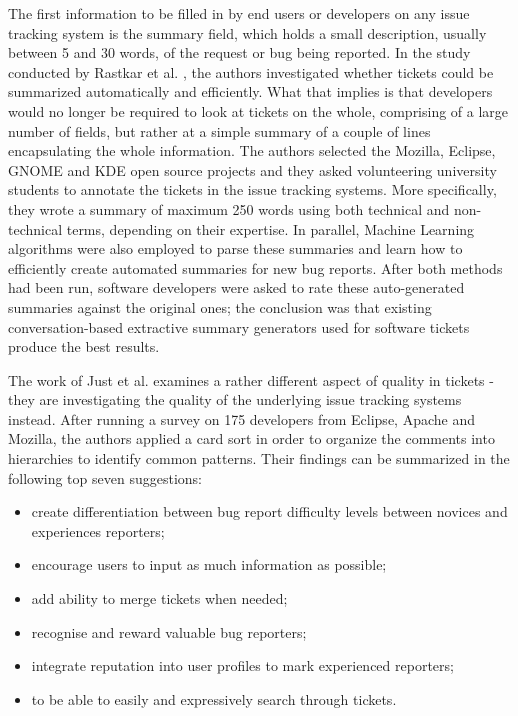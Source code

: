 \documentclass{mpaper}
\begin{document}
The first information to be filled in by end users or developers on any issue tracking system
is the summary field, which holds a small description, usually between 5 and 30 words, of 
the request or bug being reported. In the study conducted by Rastkar et al. \cite{rastkar2010summarizing}, 
the authors investigated whether tickets could be summarized automatically and efficiently. What 
that implies is that developers would no longer be required to look at tickets on the whole, comprising of 
a large number of fields, but rather at a simple summary of a couple of lines 
encapsulating the whole information. The authors selected the Mozilla, Eclipse, GNOME and KDE 
open source projects and they asked volunteering university students to annotate 
the tickets in the issue tracking systems. More specifically, they wrote a summary 
of maximum 250 words using both technical and non-technical terms, depending on their expertise. 
In parallel, Machine Learning algorithms were also employed to parse these summaries and 
learn how to efficiently create automated summaries for new bug reports. After both methods had been run, 
software developers were asked to rate these auto-generated summaries against the original ones; 
the conclusion was that existing conversation-based extractive summary generators used 
for software tickets produce the best results.

The work of Just et al. \cite{just2008towards} examines a rather different aspect
of quality in tickets - they are investigating the quality of the underlying issue 
tracking systems instead. 
After running a survey on 175 developers from Eclipse, Apache and Mozilla,
the authors applied a card sort in order to organize the comments into hierarchies to 
identify common patterns. Their findings can be summarized in the following top seven
suggestions:
  \begin{itemize}
    \item create differentiation between bug report difficulty levels between 
    novices and experiences reporters;
    \item encourage users to input as much information as possible;
    \item add ability to merge tickets when needed;
    \item recognise and reward valuable bug reporters;
    \item integrate reputation into user profiles to mark experienced reporters;
    \item to be able to easily and expressively search through tickets.
  \end{itemize}
\end{document}
